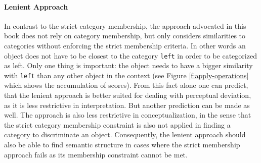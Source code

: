 \paragraph*{Lenient Approach}
In contrast to the strict category membership, the approach 
advocated in this book does not rely on category membership, 
but only considers similarities to categories without enforcing the strict
membership criteria. In other words an object does not have to be closest
to the category {\footnotesize\tt left} in order to be categorized as left. Only one 
thing is important: the object needs to have a bigger similarity with 
{\footnotesize\tt left} than any other object in the context (see Figure 
\ref{f:apply-operations} which shows the accumulation of scores).
From this fact alone one can predict, that the lenient approach
is better suited for dealing with perceptual deviation, as it is less 
restrictive in interpretation. But another prediction can be made as
well. The approach is also less restrictive in conceptualization,
in the sense that the strict category membership constraint is
also not applied in finding a category to discriminate an object.
Consequently, the lenient approach should also be able 
to find semantic structure in cases where the strict membership
approach fails as its membership constraint cannot be met.

